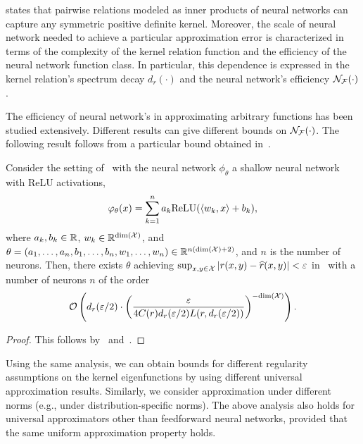  states that pairwise relations modeled as inner products of neural networks can capture any symmetric positive definite kernel. Moreover, the scale of neural network needed to achieve a particular approximation error is characterized in terms of the complexity of the kernel relation function and the efficiency of the neural network function class. In particular, this dependence is expressed in the kernel relation's spectrum decay $d_r(\cdot)$ and the neural network's efficiency ${\mathcal{N}}_{\mathcal{F}}(\cdot)$.

The efficiency of neural network's in approximating arbitrary functions has been studied extensively. Different results can give different bounds on ${\mathcal{N}}_{\mathcal{F}}(\cdot)$. The following result follows from a particular bound obtained in~\parencite{poggioWhyWhenCan2017}.

\begin{corollary}\label{cor:sym_iprod_kernel_neuron_bound}
	Consider the setting of~ with the neural network $\phi_\theta$ a shallow neural network with ReLU activations,
	\begin{equation*}
		\phi_\theta(x) = \sum_{k=1}^{n} a_k \mathrm{ReLU}(\iprod{w_k}{x} + b_k),
	\end{equation*}
	where $a_k, b_k \in \mathbb{R}$, $w_k \in \mathbb{R}^{\mathrm{dim}({\mathcal{X}})}$, and $\theta = (a_1, \ldots, a_n, b_1, \ldots, b_n, w_1, \ldots, w_n) \in \mathbb{R}^{n (\mathrm{dim}({\mathcal{X}}) + 2)}$, and $n$ is the number of neurons. Then, there exists $\theta$ achieving $\sup_{x,y \in \mathcal{X}}{\left\lvert r(x,y) - \widehat{r}(x,y)\right\rvert} < \varepsilon$ in~ with a number of neurons $n$ of the order
	\[{\mathcal{O}}\left(d_r(\varepsilon / 2) \cdot \left(\frac{\varepsilon}{4 C(r) d_r(\varepsilon / 2) L(r, d_r(\varepsilon/2))}\right)^{-\mathrm{dim}({\mathcal{X}})}\right).\]
\end{corollary}
\begin{proof}
	This follows by~ and~\parencite[Theorem 4]{poggioWhyWhenCan2017}.
\end{proof}


Using the same analysis, we can obtain bounds for different regularity assumptions on the kernel eigenfunctions by using different universal approximation results. Similarly, we consider approximation under different norms (e.g., under distribution-specific norms). The above analysis also holds for universal approximators other than feedforward neural networks, provided that the same uniform approximation property holds.